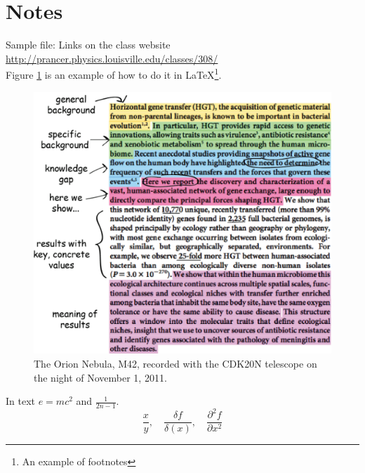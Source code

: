 
\newpage
\section{Notes}

Sample file: Links on the class website \url{http://prancer.physics.louisville.edu/classes/308/} \\
Figure \ref{fig:graph1} is an example of  how to do it in \LaTeX \footnote{An example of footnotes}.
\begin{figure}[h]  %
	\begin{center}
	\includegraphics[scale=0.5]{image/good_abstract.png}
	\end{center}
	\caption{The Orion Nebula, M42, recorded with the CDK20N telescope on the night of November 1, 2011.}
	\label{fig:graph1}
\end{figure}

In text $e=mc^2$ and $\frac{1}{2n-1}$.\\

\begin{equation}
\frac{x}{y}, \quad
\frac{\delta{f}}{\delta(x)},\quad
\frac{\partial^{2}{f}}{\partial{x}{^2}}
\end{equation}

\cite{Sudsang00_Grasping_In-handManipulation}
\cite{Kalker_1991_RC}
\cite{Yousef_2011_Tactile_Sensing}

